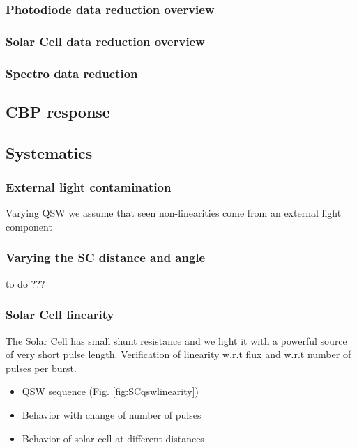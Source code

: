 \documentclass[onecolumn]{aa}
\begin{document}
\subsubsection{Photodiode data reduction overview}

\subsubsection{Solar Cell data reduction overview}

\subsubsection{Spectro data reduction}


\subsection{CBP response}

\subsection{Systematics}


\subsubsection{External light contamination}

Varying QSW we assume that seen non-linearities come from an external light component

\subsubsection{Varying the SC distance and angle}

to do ???


\subsubsection{Solar Cell linearity}

The Solar Cell has small shunt resistance and we light it with a powerful source
of very short pulse length. Verification of linearity w.r.t flux and w.r.t
number of pulses per burst. 


\begin{itemize}
  \item QSW sequence  (Fig. \ref{fig:SCqswlinearity})
  \item Behavior with change of number of pulses
  \item Behavior of solar cell at different distances
\end{itemize}
\end{document}
